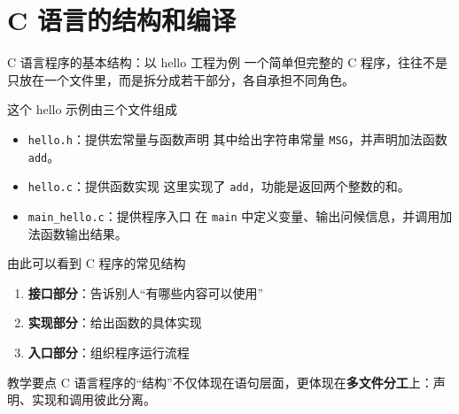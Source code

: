 \documentclass[aspectratio=169,11pt]{beamer}
\begin{document}
\section{C 语言的结构和编译}


\begin{frame}{C 语言程序的基本结构：以 hello 工程为例}
一个简单但完整的 C 程序，往往不是只放在一个文件里，而是拆分成若干部分，各自承担不同角色。

\vspace{0.5em}
\begin{block}{这个 hello 示例由三个文件组成}
\begin{itemize}
  \item \texttt{hello.h}：提供宏常量与函数声明  
  其中给出字符串常量 \texttt{MSG}，并声明加法函数 \texttt{add}。 
  \item \texttt{hello.c}：提供函数实现  
  这里实现了 \texttt{add}，功能是返回两个整数的和。
  \item \texttt{main\_hello.c}：提供程序入口  
  在 \texttt{main} 中定义变量、输出问候信息，并调用加法函数输出结果。
\end{itemize}
\end{block}

\vspace{0.4em}
\begin{exampleblock}{由此可以看到 C 程序的常见结构}
\begin{enumerate}
  \item \textbf{接口部分}：告诉别人“有哪些内容可以使用”
  \item \textbf{实现部分}：给出函数的具体实现
  \item \textbf{入口部分}：组织程序运行流程
\end{enumerate}
\end{exampleblock}

\vspace{0.3em}
\begin{alertblock}{教学要点}
C 语言程序的“结构”不仅体现在语句层面，更体现在\textbf{多文件分工}上：声明、实现和调用彼此分离。
\end{alertblock}
\end{frame}
\end{document}
